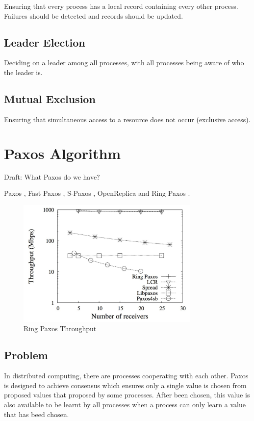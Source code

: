 \documentclass[12pt, a4paper]{article}
\begin{document}
Ensuring that every process has a local record containing every other process.
Failures should be detected and records should be updated.

\subsection{Leader Election}

Deciding on a leader among all processes, with all processes being aware of
who the leader is.

\subsection{Mutual Exclusion}

Ensuring that simultaneous access to a resource does not occur (exclusive
access).


\section{Paxos Algorithm} \label{sec:paxos}

Draft: What Paxos do we have?

Paxos \cite{lamport2001paxos}, Fast Paxos \cite{fastpaxos}, 
S-Paxos \cite{spaxos}, 
OpenReplica \cite{openreplica} and Ring Paxos \cite{ringpaxos}.

\begin{figure}[htp]
  \centering
  \includegraphics[width=0.8\textwidth]{img/RingPaxosThroughput.jpg}
  \caption{Ring Paxos Throughput}
  \label{fig:RingPaxosThroughput}
\end{figure}


\subsection{Problem}
In distributed computing, there are processes cooperating with each other. 
Paxos is designed to achieve consensus which ensures 
only a single value is chosen from proposed values that 
proposed by some processes\cite{fischer1983consensus}. 
After been chosen, this value is also available to be learnt by all processes
when a process can only learn a value that has beed chosen.
\end{document}
